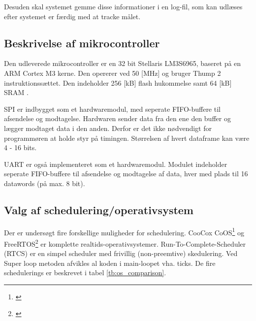 Desuden skal systemet gemme disse informationer i en log-fil,
som kan udlæses efter systemet er færdig med at tracke målet.

\subsection{Beskrivelse af mikrocontroller}
Den udleverede mikrocontroller er en 32 bit Stellaris LM3S6965, baseret på en ARM Cortex M3 kerne. Den opererer ved 50 [MHz] og bruger Thump 2 instruktionssættet. Den indeholder 256 [kB] flash hukommelse samt 64 [kB] SRAM \citep{lm3s6965}.

SPI er indbygget som et hardwaremodul, med seperate FIFO-buffere til afsendelse og modtagelse. Hardwaren sender data fra den ene den buffer og lægger modtaget data i den anden. Derfor er det ikke nødvendigt for programmøren at holde styr på timingen. Størrelsen af hvert dataframe kan være 4 - 16 bits. 

UART er også implementeret som et hardwaremodul. Modulet indeholder seperate FIFO-buffere til afsendelse og modtagelse af data, hver med plads til 16 datawords (på max. 8 bit). 

\subsection{Valg af schedulering/operativsystem}
Der er undersøgt fire forskellige muligheder for schedulering.
CooCox CoOS\footnote{\citep{www.coocox.com/CoOS.htm}} og FreeRTOS\footnote{\citep{freertos.org}}
er komplette realtids-operativsystemer. 
Run-To-Complete-Scheduler (RTCS) er en simpel scheduler med frivillig (non-preemtive) skedulering.
Ved Super loop metoden afvikles al koden i main-loopet vha. ticks.
De fire schedulerings er beskrevet i tabel \ref{tb:os_comparison}.

